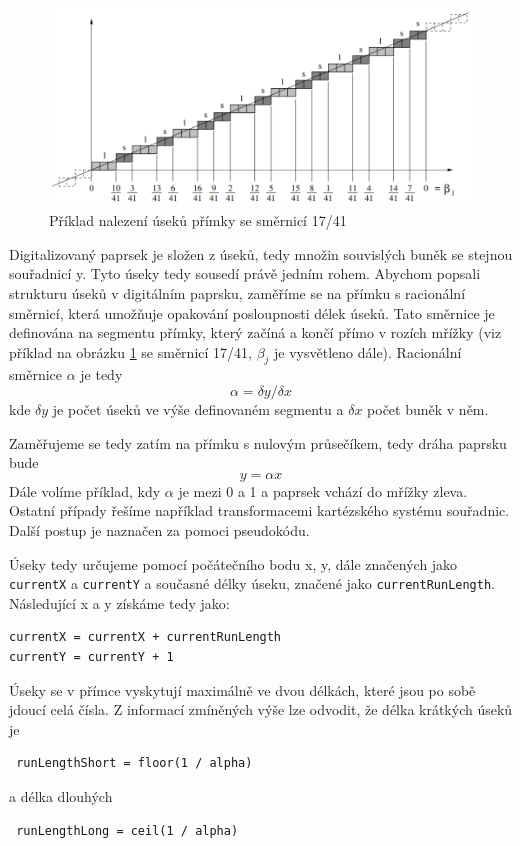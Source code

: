 \documentclass[report,11pt]{elsarticle}
\begin{document}
\begin{figure}[h]
\hfill\includegraphics[width=0.8\linewidth]{The-structure-of-runs-within-the-digital-line-y-17-41-x.png}\hspace*{\fill}
\caption{Příklad nalezení úseků přímky se směrnicí 17/41}
\label{fig:example}
\end{figure}

Digitalizovaný paprsek je složen z úseků, tedy množin souvislých buněk se stejnou souřadnicí y. Tyto úseky tedy sousedí právě jedním rohem. Abychom popsali strukturu úseků v digitálním paprsku, zaměříme se na přímku s racionální směrnicí, která umožňuje opakování posloupnosti délek úseků. Tato směrnice je definována na segmentu přímky, který začíná a končí přímo v rozích mřížky (viz příklad na obrázku \ref{fig:example} se směrnicí 17/41, \(\beta _j\) je vysvětleno dále). Racionální směrnice \(\alpha\) je tedy
\[\alpha = \delta y / \delta x\]
kde \(\delta y\) je počet úseků ve výše definovaném segmentu a \(\delta x\) počet buněk v něm.

Zaměřujeme se tedy zatím na přímku s nulovým průsečíkem, tedy dráha paprsku bude
\[y = \alpha x\]
Dále volíme příklad, kdy \(\alpha\) je mezi 0 a 1 a paprsek vchází do mřížky zleva. Ostatní případy řešíme například transformacemi kartézského systému souřadnic. Další postup je naznačen za pomoci pseudokódu.

Úseky tedy určujeme pomocí počátečního bodu x, y, dále značených jako \verb|currentX| a \verb|currentY| a současné délky úseku, značené jako  \verb|currentRunLength|. Následující x a y získáme tedy jako:

\begin{verbatim}
currentX = currentX + currentRunLength
currentY = currentY + 1
\end{verbatim}

Úseky se v přímce vyskytují maximálně ve dvou délkách, které jsou po sobě jdoucí celá čísla. Z informací zmíněných výše lze odvodit, že délka krátkých úseků je 
\begin{verbatim} runLengthShort = floor(1 / alpha) \end{verbatim}
a délka dlouhých
\begin{verbatim} runLengthLong = ceil(1 / alpha) \end{verbatim}
\end{document}
